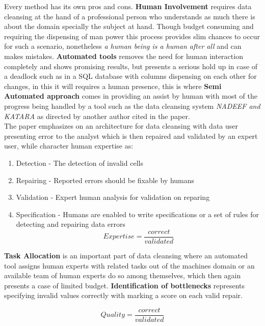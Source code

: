 \documentclass[12pt]{article}
\begin{document}
Every method has its own pros and cons. \textbf{Human Involvement} requires data cleansing at the hand of a professional person who understands as much there is about the domain specially the subject at hand. Though budget consuming and requiring the dispensing of man power this process provides slim chances to occur for such a scenario, nonetheless \emph{a human being is a human after all} and can makes mistakes. \textbf{Automated tools} removes the need for human interaction completely and shows promising results, but presents a serious hold up in case of a deadlock such as in a SQL database with columns dispensing on each other for changes, in this it will requires a human presence, this is where \textbf{Semi Automated approach} comes in providing an assist by human with most of the progress being handled by a tool such as the data cleansing system \emph{NADEEF and KATARA} as directed by another author cited in the paper. \\
The paper emphasizes on an architecture for data cleansing with data user presenting error to the analyst which is then repaired and validated by an expert user, while character human expertise as:

\begin{enumerate}
	\item Detection - The detection of invalid cells
	\item Repairing - Reported errors should be fixable by humans
	\item Validation - Expert human analysis for validation on reparing
	\item Specification - Humans are enabled to write specifications or a set of rules for detecting and repairing data errors
	\begin{equation} Expertise = \frac{correct}{validated} \end{equation}
\end{enumerate}

\textbf{Task Allocation} is an important part of data cleansing where an automated tool assigns human experts with related tasks out of the machines domain or an available team of human experts do so among themselves, which then again presents a case of limited budget. \textbf{Identification of bottlenecks} represents specifying invalid values correctly with marking a score on each valid repair.

\begin{equation} Quality = \frac{correct}{validated} \end{equation}
\end{document}
